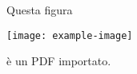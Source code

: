 \documentclass{article}
\begin{document}
\begin{center}
    Questa figura

    \bigbreak

    \texttt{[image: example-image]}

    \bigbreak

    è un PDF importato.
\end{center}
\end{document}
